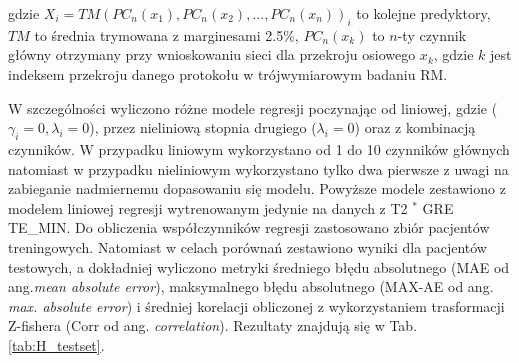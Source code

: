 gdzie $X_i = TM(PC_n(x_1), PC_n(x_2),..., PC_n(x_n))_{i}$ to kolejne predyktory, $TM$ to średnia trymowana z marginesami 2.5\%, $PC_n(x_k)$ to $n$-ty czynnik główny otrzymany przy wnioskowaniu sieci dla przekroju osiowego $x_k$, gdzie $k$ jest indeksem przekroju danego protokołu w trójwymiarowym badaniu RM.

W szczególności wyliczono różne modele regresji poczynając od liniowej, gdzie ($\gamma_{i}=0, \lambda_{i}=0$), przez nieliniową stopnia drugiego ($\lambda_{i}=0$) oraz z kombinacją czynników. W przypadku liniowym wykorzystano od 1 do 10 czynników głównych natomiast w przypadku nieliniowym wykorzystano tylko dwa pierwsze z uwagi na zabieganie nadmiernemu dopasowaniu się modelu. Powyższe modele zestawiono z modelem liniowej regresji wytrenowanym jedynie na danych z T2 $^\ast$ GRE TE\_MIN. Do obliczenia współczynników regresji zastosowano zbiór pacjentów treningowych. Natomiast w celach porównań zestawiono wyniki dla pacjentów testowych, a dokładniej wyliczono metryki średniego błędu absolutnego (MAE od ang.\textit{mean absolute error}), maksymalnego błędu absolutnego (MAX-AE od ang. \textit{max. absolute error}) i średniej korelacji obliczonej z wykorzystaniem trasformacji Z-fishera (Corr od ang. \textit{correlation}). Rezultaty znajdują się w Tab. \ref{tab:H_testset}.

